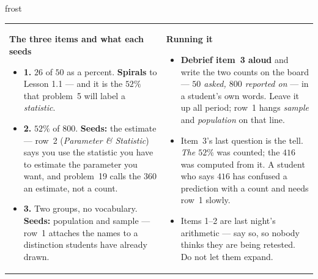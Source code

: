 \documentclass[10pt]{article}
\begin{document}
\begin{fixedskillbox}{frost}
\begin{tabularx}{\linewidth}{@{}X X@{}}
\begin{minipage}[t]{\linewidth}\vspace{0pt}
    \textbf{The three items and what each seeds}
    \begin{itemize}[leftmargin=1.1em, itemsep=1pt, topsep=2pt]
      \item \textbf{1.} $26$ of $50$ as a percent. \textbf{Spirals} to Lesson 1.1 --- and it is
            the $52\%$ that problem~5 will label a \emph{statistic}.
      \item \textbf{2.} $52\%$ of $800$. \textbf{Seeds:} the estimate --- row~2 (\emph{Parameter \&
            Statistic}) says you use the statistic you have to estimate the parameter you want,
            and problem~19 calls the $360$ an estimate, not a count.
      \item \textbf{3.} Two groups, no vocabulary. \textbf{Seeds:} population and sample ---
            row~1 attaches the names to a distinction students have already drawn.
    \end{itemize}
\end{minipage}
&
\begin{minipage}[t]{\linewidth}\vspace{0pt}
    \textbf{Running it}
    \begin{itemize}[leftmargin=1.1em, itemsep=1pt, topsep=2pt]
      \item \textbf{Debrief item~3 aloud} and write the two counts on the board --- \emph{$50$
            asked, $800$ reported on} --- in a student's own words. Leave it up all period;
            row~1 hangs \emph{sample} and \emph{population} on that line.
      \item Item~3's last question is the tell. \emph{The $52\%$} was counted; the $416$ was
            computed from it. A student who says $416$ has confused a prediction with a count
            and needs row~1 slowly.
      \item Items 1--2 are last night's arithmetic --- say so, so nobody thinks they are being
            retested. Do not let them expand.
    \end{itemize}
\end{minipage}
\end{tabularx}
\end{fixedskillbox}
\end{document}
